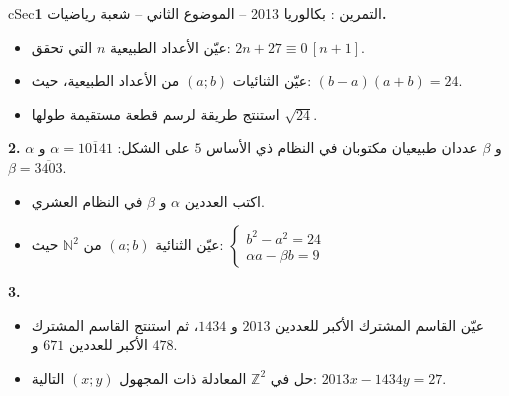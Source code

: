 \documentclass[12pt,a4paper]{article}
\newenvironment{BOX}[2]{\begin{otherlanguage}{english}\begin{arbox}{#1}{#2}}{\end{arbox}\end{otherlanguage}}
\newcounter{exo}
\newenvironment{tamrin}[1]{\stepcounter{exo}\begin{BOX}{cSec}{التمرين \theexo: #1}}{\end{BOX}}
\newcommand{\N}{\mathbb{N}}
\newcommand{\Z}{\mathbb{Z}}
\newenvironment{sq}{\begin{itemize}[leftmargin=2.4em,itemsep=3pt]}{\end{itemize}}
\newcommand{\qa}{\item[(أ)]}\newcommand{\qb}{\item[(ب)]}\newcommand{\qc}{\item[(جـ)]}\newcommand{\qd}{\item[(د)]}\newcommand{\qe}{\item[(هـ)]}
\begin{document}
\begin{tamrin}{بكالوريا 2013 -- الموضوع الثاني -- شعبة رياضيات}
\textbf{1.}
\begin{sq}
\qa عيّن الأعداد الطبيعية $n$ التي تحقق: $2n+27\equiv0\,[n+1]$.
\qb عيّن الثنائيات $(a;b)$ من الأعداد الطبيعية، حيث: $(b-a)(a+b)=24$.
\qc استنتج طريقة لرسم قطعة مستقيمة طولها $\sqrt{24}$.
\end{sq}
\textbf{2.} $\alpha$ و $\beta$ عددان طبيعيان مكتوبان في النظام ذي الأساس $5$ على الشكل: $\alpha=\overline{10141}$ و $\beta=\overline{3403}$.
\begin{sq}
\qa اكتب العددين $\alpha$ و $\beta$ في النظام العشري.
\qb عيّن الثنائية $(a;b)$ من $\N^2$ حيث: $\begin{cases}b^2-a^2=24\\ \alpha a-\beta b=9\end{cases}$
\end{sq}
\textbf{3.}
\begin{sq}
\qa عيّن القاسم المشترك الأكبر للعددين $2013$ و $1434$، ثم استنتج القاسم المشترك الأكبر للعددين $671$ و $478$.
\qb حل في $\Z^2$ المعادلة ذات المجهول $(x;y)$ التالية: $2013x-1434y=27$.
\end{sq}
\end{tamrin}
\end{document}
